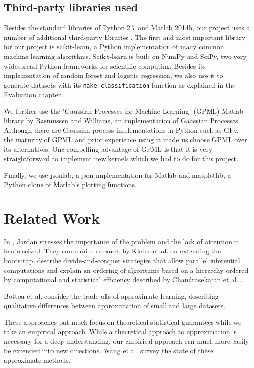 \documentclass[a4paper,12pt,twoside,openright]{report}
\begin{document}
\section{Third-party libraries used}
Besides the standard libraries of Python 2.7 and Matlab 2014b, our project uses a number of additional third-party libraries . The first and most important library for our project is scikit-learn, a Python implementation of many common machine learning algorithms. Scikit-learn is built on NumPy and SciPy, two very widespread Python frameworks for scientific computing. Besides its implementation of random forest and logistic regression, we also use it to generate datasets with its \texttt{make\_classification} function as explained in the Evaluation chapter.

We further use the "Gaussian Processes for Machine Learning" (GPML) Matlab library by Rasmussen and Williams, an implementation of Gaussian Processes. Although there are Gaussian process implementations in Python such as GPy, the maturity of GPML and prior experience using it made us choose GPML over its alternatives. One compelling advantage of GPML is that it is very straightforward to implement new kernels which we had to do for this project.

Finally, we use jsonlab, a json implementation for Matlab and matplotlib, a Python clone of Matlab's plotting functions.



\chapter{Related Work}


In \cite{jordan2013}, Jordan stresses the importance of the problem and the lack of attention it has received. They summarise research by Kleine et al. \cite{RSSB:RSSB12050} on extending the bootstrap, describe divide-and-conquer strategies that allow parallel inferential computations and explain an ordering of algorithms based on a hierarchy ordered by computational and statistical efficiency described by Chandrasekaran et al. \cite{Chandrasekaran26032013}.

Bottou et al. \cite{Bottou08thetradeoffs} consider the trade-offs of approximate learning, describing qualitative differences between approximation of small and large datasets. 

These approaches put much focus on theoretical statistical guarantees while we take an empirical approach. While a theoretical approach to approximation is necessary for a deep understanding, our empirical approach can much more easily be extended into new directions. Wang et al. \cite{2015arXiv150207989W} survey the state of these approximate methods.
\end{document}
